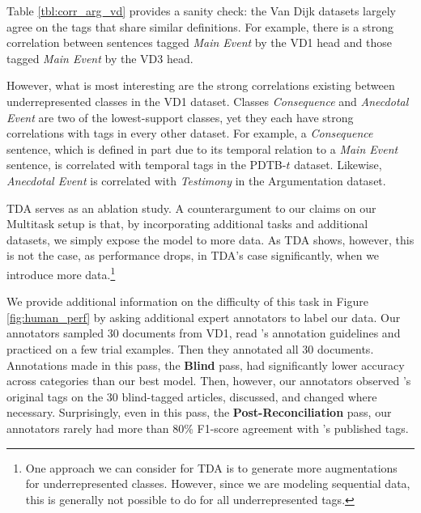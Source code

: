 \documentclass[11pt]{article}
\newcommand\nd{VD1\xspace}
\newcommand\spangh{VD3\xspace}
\begin{document}
Table \ref{tbl:corr_arg_vd} provides a sanity check: the Van Dijk datasets largely agree on the tags that share similar definitions. For example, there is a strong correlation between sentences tagged \textit{Main Event} by the \nd head and those tagged \textit{Main Event} by the \spangh head. 

However, what is most interesting are the strong correlations existing between underrepresented classes in the \nd dataset. Classes \textit{Consequence} and \textit{Anecdotal Event} are two of the lowest-support classes, yet they each have strong correlations with tags in every other dataset. For example, a \textit{Consequence} sentence, which is defined in part due to its temporal relation to a \textit{Main Event} sentence, is correlated with temporal tags in the PDTB-$t$ dataset. Likewise, \textit{Anecdotal Event} is correlated with \textit{Testimony} in the Argumentation dataset.


TDA serves as an ablation study.
A counterargument to our claims on our Multitask setup is that, by incorporating additional tasks and additional datasets, we simply expose the model to more data. As TDA shows, however, this is not the case, as performance drops, in TDA's case significantly, when we introduce more data.\footnote{One approach we can consider for TDA is to generate more augmentations for underrepresented classes. However, since we are modeling sequential data, this is generally not possible to do for all underrepresented tags.}

We provide additional information on the difficulty of this task in Figure \ref{fig:human_perf} by asking additional expert annotators to label our data. Our annotators sampled 30 documents from \nd, read 's annotation guidelines and practiced on a few trial examples. Then they annotated all 30 documents. Annotations made in this pass, the \textbf{Blind} pass, had significantly lower accuracy across categories than our best model. Then, however, our annotators observed 's original tags on the 30 blind-tagged articles, discussed, and changed where necessary. Surprisingly, even in this pass, the \textbf{Post-Reconciliation} pass, our annotators rarely had more than 80\% F1-score agreement with 's published tags. 
\end{document}
